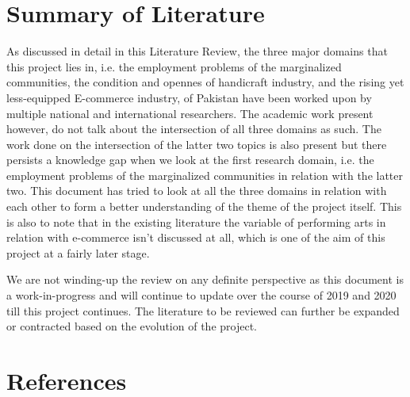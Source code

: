\section{Summary of Literature}

As discussed in detail in this Literature Review, the three major domains that this project lies in, i.e. the employment problems of the marginalized communities, the condition and opennes of handicraft industry, and the rising yet less-equipped E-commerce industry, of Pakistan have been worked upon by multiple national and international researchers. The academic work present however, do not talk about the intersection of all three domains as such. The work done on the intersection of the latter two topics is also present but there persists a knowledge gap when we look at the first research domain, i.e. the employment problems of the marginalized communities in relation with the latter two. This document has tried to look at all the three domains in relation with each other to form a better understanding of the theme of the project itself. This is also to note that in the existing literature the variable of performing arts in relation with e-commerce isn't discussed at all, which is one of the aim of this project at a fairly later stage. 

We are not winding-up the review on any definite perspective as this document is a work-in-progress and will continue to update over the course of 2019 and 2020 till this project continues. The literature to be reviewed can further be expanded or contracted based on the evolution of the project. 
\section{References}

